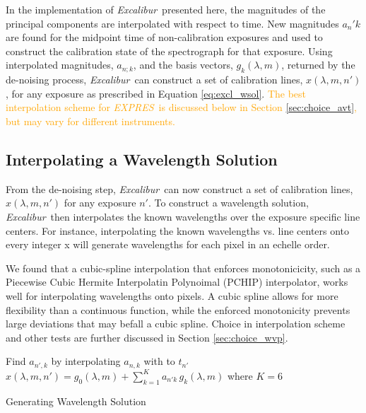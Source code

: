 \documentclass[modern]{aastex63}
\newcommand{\project}[1]{\textsl{#1}}
\newcommand{\name}{\project{Excalibur}}
\newcommand{\acronym}[1]{{\small{#1}}}
\newcommand{\expres}{\project{\acronym{EXPRES}}}
\newcommand{\lz}[1]{\textcolor{orange}{#1}}
\begin{document}
In the implementation of \name\ presented here, the magnitudes of the principal components are interpolated with respect to time.  New magnitudes $a_n'k$ are found for the midpoint time of non-calibration exposures and used to construct the calibration state of the spectrograph for that exposure.  Using interpolated magnitudes, $a_{n;k}$, and the basis vectors, $g_k(\lambda,m)$, returned by the de-noising process, \name\ can construct a set of calibration lines, $x(\lambda,m,n') $, for any exposure as prescribed in Equation \ref{eq:excl_wsol}.  \lz{The best interpolation scheme for \expres\ is discussed below in Section \ref{sec:choice_avt}, but may vary for different instruments.}


\subsection{Interpolating a Wavelength Solution} \label{sec:interp_wsol}
From the de-noising step, \name\ can now construct a set of calibration lines, $x(\lambda,m,n')$ for any exposure $n'$.  To construct a wavelength solution, \name\ then interpolates the known wavelengths over the exposure specific line centers.  For instance, interpolating the known wavelengths vs. line centers onto every integer x will generate wavelengths for each pixel in an echelle order.

We found that a cubic-spline interpolation that enforces monotonicicity, such as a Piecewise Cubic Hermite Interpolatin Polynoimal (PCHIP) interpolator, works well for interpolating wavelengths onto pixels.  A cubic spline allows for more flexibility than a continuous function, while the enforced monotonicity prevents large deviations that may befall a cubic spline.  Choice in interpolation scheme and other tests are further discussed in Section \ref{sec:choice_wvp}.

\begin{algorithm}
\SetAlgoLined
{}

Find $a_{n',k}$ by interpolating $a_{n,k}$ with to $t_{n'}$\;
$x(\lambda,m,n') = g_0(\lambda,m) + \sum_{k=1}^K a_{n'k}\,g_k(\lambda,m)$ where $K=6$\;
\caption{Generating Wavelength Solution}
\end{algorithm}
\end{document}
